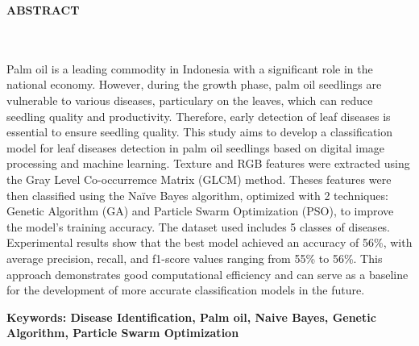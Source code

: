 \clearpage
{}%
\thispagestyle{fancy}

\begin{center}
	\large \bfseries \MakeUppercase{Abstract}\\
	\normalsize \normalfont {\thetitleEN}\\
	\normalsize \normalfont {\theauthor}\\
	\bigskip
	
	\normalsize \normalfont \justifying \singlespacing
	Palm oil is a leading commodity in Indonesia with a significant role in the national economy. However, during the growth phase, palm oil seedlings are vulnerable to various diseases, particulary on the leaves, which can reduce seedling quality and productivity. Therefore, early detection of leaf diseases is essential to ensure seedling quality. This study aims to develop a classification model for leaf diseases detection in palm oil seedlings based on digital image processing and machine learning. Texture and RGB features were extracted using the Gray Level Co-occurremce Matrix (GLCM) method. Theses features were then classified using the Naïve Bayes algorithm, optimized with 2 techniques: Genetic Algorithm (GA) and Particle Swarm Optimization (PSO), to improve the model's training accuracy. The dataset used includes 5 classes of diseases. Experimental results show that the best model achieved an accuracy of 56\%, with average precision, recall, and f1-score values ranging from 55\% to 56\%. This approach demonstrates good computational efficiency and can serve as a baseline for the development of more accurate classification models in the future.
	
	\textbf{Keywords: Disease Identification, Palm oil, Naive Bayes, Genetic Algorithm, Particle Swarm Optimization}
	
	\vfill
	
\end{center}
\clearpage
